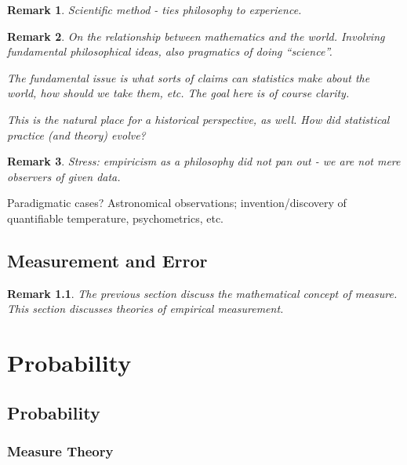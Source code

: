 \documentclass[reqno,12pt]{tufte-book}
\numberwithin{equation}{subsection}
\newtheorem{remark}{Remark}
\begin{document}
\begin{remark}
  Scientific method - ties philosophy to experience.
\end{remark}

\begin{remark}
  On the relationship between mathematics and the world.  Involving
  fundamental philosophical ideas, also pragmatics of \textit{doing}
  ``science''.

  The fundamental issue is what sorts of claims can statistics make
  about the world, how should we take them, etc.  The goal here is of
  course clarity.

  This is the natural place for a historical perspective, as well.
  How did statistical practice (and theory) evolve?
\end{remark}

\begin{remark}
  Stress: empiricism as a philosophy did not pan out - we are not mere
  observers of given data.
\end{remark}

Paradigmatic cases?  Astronomical observations; invention/discovery of
quantifiable temperature, psychometrics, etc.

\chapter{Measurement and Error}

\begin{remark}
  The previous section discuss the mathematical concept of measure.
  This section discusses theories of empirical measure\textit{ment}.
\end{remark}

\part{Probability}

\chapter{Probability}

\section{Measure Theory}
\end{document}
